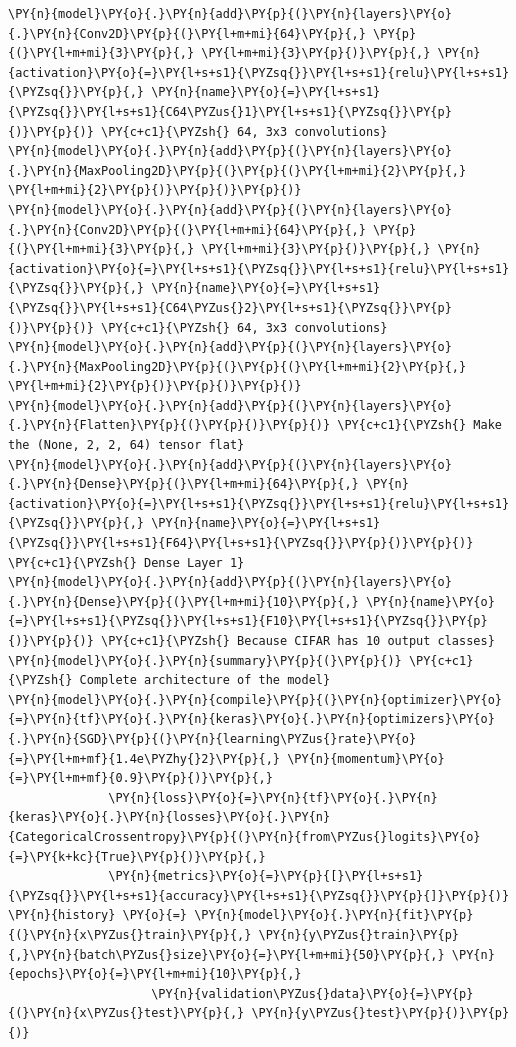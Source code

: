 \documentclass[a4paper,11pt]{article}%
\begin{document}
\begin{tcolorbox}[breakable, size=fbox, boxrule=1pt, pad at break*=1mm,colback=cellbackground, colframe=cellborder]
\begin{Verbatim}[commandchars=\\\{\}]
\PY{n}{model}\PY{o}{.}\PY{n}{add}\PY{p}{(}\PY{n}{layers}\PY{o}{.}\PY{n}{Conv2D}\PY{p}{(}\PY{l+m+mi}{64}\PY{p}{,} \PY{p}{(}\PY{l+m+mi}{3}\PY{p}{,} \PY{l+m+mi}{3}\PY{p}{)}\PY{p}{,} \PY{n}{activation}\PY{o}{=}\PY{l+s+s1}{\PYZsq{}}\PY{l+s+s1}{relu}\PY{l+s+s1}{\PYZsq{}}\PY{p}{,} \PY{n}{name}\PY{o}{=}\PY{l+s+s1}{\PYZsq{}}\PY{l+s+s1}{C64\PYZus{}1}\PY{l+s+s1}{\PYZsq{}}\PY{p}{)}\PY{p}{)} \PY{c+c1}{\PYZsh{} 64, 3x3 convolutions}
\PY{n}{model}\PY{o}{.}\PY{n}{add}\PY{p}{(}\PY{n}{layers}\PY{o}{.}\PY{n}{MaxPooling2D}\PY{p}{(}\PY{p}{(}\PY{l+m+mi}{2}\PY{p}{,} \PY{l+m+mi}{2}\PY{p}{)}\PY{p}{)}\PY{p}{)}
\PY{n}{model}\PY{o}{.}\PY{n}{add}\PY{p}{(}\PY{n}{layers}\PY{o}{.}\PY{n}{Conv2D}\PY{p}{(}\PY{l+m+mi}{64}\PY{p}{,} \PY{p}{(}\PY{l+m+mi}{3}\PY{p}{,} \PY{l+m+mi}{3}\PY{p}{)}\PY{p}{,} \PY{n}{activation}\PY{o}{=}\PY{l+s+s1}{\PYZsq{}}\PY{l+s+s1}{relu}\PY{l+s+s1}{\PYZsq{}}\PY{p}{,} \PY{n}{name}\PY{o}{=}\PY{l+s+s1}{\PYZsq{}}\PY{l+s+s1}{C64\PYZus{}2}\PY{l+s+s1}{\PYZsq{}}\PY{p}{)}\PY{p}{)} \PY{c+c1}{\PYZsh{} 64, 3x3 convolutions}
\PY{n}{model}\PY{o}{.}\PY{n}{add}\PY{p}{(}\PY{n}{layers}\PY{o}{.}\PY{n}{MaxPooling2D}\PY{p}{(}\PY{p}{(}\PY{l+m+mi}{2}\PY{p}{,} \PY{l+m+mi}{2}\PY{p}{)}\PY{p}{)}\PY{p}{)}
\PY{n}{model}\PY{o}{.}\PY{n}{add}\PY{p}{(}\PY{n}{layers}\PY{o}{.}\PY{n}{Flatten}\PY{p}{(}\PY{p}{)}\PY{p}{)} \PY{c+c1}{\PYZsh{} Make the (None, 2, 2, 64) tensor flat}
\PY{n}{model}\PY{o}{.}\PY{n}{add}\PY{p}{(}\PY{n}{layers}\PY{o}{.}\PY{n}{Dense}\PY{p}{(}\PY{l+m+mi}{64}\PY{p}{,} \PY{n}{activation}\PY{o}{=}\PY{l+s+s1}{\PYZsq{}}\PY{l+s+s1}{relu}\PY{l+s+s1}{\PYZsq{}}\PY{p}{,} \PY{n}{name}\PY{o}{=}\PY{l+s+s1}{\PYZsq{}}\PY{l+s+s1}{F64}\PY{l+s+s1}{\PYZsq{}}\PY{p}{)}\PY{p}{)} \PY{c+c1}{\PYZsh{} Dense Layer 1}
\PY{n}{model}\PY{o}{.}\PY{n}{add}\PY{p}{(}\PY{n}{layers}\PY{o}{.}\PY{n}{Dense}\PY{p}{(}\PY{l+m+mi}{10}\PY{p}{,} \PY{n}{name}\PY{o}{=}\PY{l+s+s1}{\PYZsq{}}\PY{l+s+s1}{F10}\PY{l+s+s1}{\PYZsq{}}\PY{p}{)}\PY{p}{)} \PY{c+c1}{\PYZsh{} Because CIFAR has 10 output classes}
\PY{n}{model}\PY{o}{.}\PY{n}{summary}\PY{p}{(}\PY{p}{)} \PY{c+c1}{\PYZsh{} Complete architecture of the model}
\PY{n}{model}\PY{o}{.}\PY{n}{compile}\PY{p}{(}\PY{n}{optimizer}\PY{o}{=}\PY{n}{tf}\PY{o}{.}\PY{n}{keras}\PY{o}{.}\PY{n}{optimizers}\PY{o}{.}\PY{n}{SGD}\PY{p}{(}\PY{n}{learning\PYZus{}rate}\PY{o}{=}\PY{l+m+mf}{1.4e\PYZhy{}2}\PY{p}{,} \PY{n}{momentum}\PY{o}{=}\PY{l+m+mf}{0.9}\PY{p}{)}\PY{p}{,}
              \PY{n}{loss}\PY{o}{=}\PY{n}{tf}\PY{o}{.}\PY{n}{keras}\PY{o}{.}\PY{n}{losses}\PY{o}{.}\PY{n}{CategoricalCrossentropy}\PY{p}{(}\PY{n}{from\PYZus{}logits}\PY{o}{=}\PY{k+kc}{True}\PY{p}{)}\PY{p}{,}
              \PY{n}{metrics}\PY{o}{=}\PY{p}{[}\PY{l+s+s1}{\PYZsq{}}\PY{l+s+s1}{accuracy}\PY{l+s+s1}{\PYZsq{}}\PY{p}{]}\PY{p}{)}
\PY{n}{history} \PY{o}{=} \PY{n}{model}\PY{o}{.}\PY{n}{fit}\PY{p}{(}\PY{n}{x\PYZus{}train}\PY{p}{,} \PY{n}{y\PYZus{}train}\PY{p}{,}\PY{n}{batch\PYZus{}size}\PY{o}{=}\PY{l+m+mi}{50}\PY{p}{,} \PY{n}{epochs}\PY{o}{=}\PY{l+m+mi}{10}\PY{p}{,} 
                    \PY{n}{validation\PYZus{}data}\PY{o}{=}\PY{p}{(}\PY{n}{x\PYZus{}test}\PY{p}{,} \PY{n}{y\PYZus{}test}\PY{p}{)}\PY{p}{)}
\end{Verbatim}
\end{tcolorbox}
 
\end{document}
